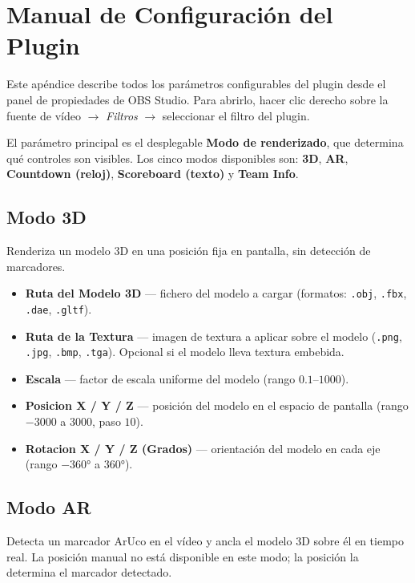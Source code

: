 \chapter{Manual de Configuración del Plugin}
\label{Appendix:Configuracion}

Este apéndice describe todos los parámetros configurables del plugin desde el panel de propiedades de OBS Studio. Para abrirlo, hacer clic derecho sobre la fuente de vídeo $\rightarrow$ \textit{Filtros} $\rightarrow$ seleccionar el filtro del plugin.

El parámetro principal es el desplegable \textbf{Modo de renderizado}, que determina qué controles son visibles. Los cinco modos disponibles son: \textbf{3D}, \textbf{AR}, \textbf{Countdown (reloj)}, \textbf{Scoreboard (texto)} y \textbf{Team Info}.

\section*{Modo 3D}

Renderiza un modelo 3D en una posición fija en pantalla, sin detección de marcadores.

\begin{itemize}
  \item \textbf{Ruta del Modelo 3D} — fichero del modelo a cargar (formatos: \texttt{.obj}, \texttt{.fbx}, \texttt{.dae}, \texttt{.gltf}).
  \item \textbf{Ruta de la Textura} — imagen de textura a aplicar sobre el modelo (\texttt{.png}, \texttt{.jpg}, \texttt{.bmp}, \texttt{.tga}). Opcional si el modelo lleva textura embebida.
  \item \textbf{Escala} — factor de escala uniforme del modelo (rango $0.1$--$1000$).
  \item \textbf{Posicion X / Y / Z} — posición del modelo en el espacio de pantalla (rango $-3000$ a $3000$, paso $10$).
  \item \textbf{Rotacion X / Y / Z (Grados)} — orientación del modelo en cada eje (rango $-360°$ a $360°$).
\end{itemize}

\section*{Modo AR}

Detecta un marcador ArUco en el vídeo y ancla el modelo 3D sobre él en tiempo real. La posición manual no está disponible en este modo; la posición la determina el marcador detectado.

